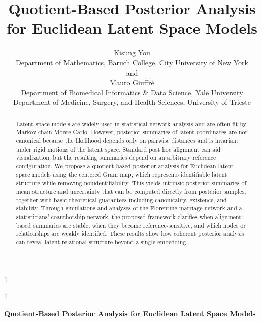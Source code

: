 \documentclass[12pt]{article}
\newcommand{\blind}{1}
\begin{document}
%

\def\spacingset#1{\renewcommand{\baselinestretch}%
{#1}\small\normalsize} \spacingset{1}



\blind
{
  \title{\bf Quotient-Based Posterior Analysis for Euclidean Latent Space Models}
  \author{Kisung You\\
    Department of Mathematics, Baruch College, City University of New York\\
    and \\
    Mauro Giuffr\`{e}\\
    Department of Biomedical Informatics \& Data Science, Yale University\\
    Department of Medicine, Surgery, and Health Sciences, University of Trieste\\
    }
  \maketitle
} \fi


\blind
{
  \bigskip
  \bigskip
  \bigskip
  \begin{center}
    {\LARGE\bf Quotient-Based Posterior Analysis for Euclidean Latent Space Models}
\end{center}
  \medskip
} \fi

\bigskip
\begin{abstract}
Latent space models are widely used in statistical network analysis and are often fit by Markov
chain Monte Carlo. However, posterior summaries of latent coordinates are not canonical because the
likelihood depends only on pairwise distances and is invariant under rigid motions of the latent
space. Standard post hoc alignment can aid visualization, but the resulting summaries depend on an
arbitrary reference configuration.  We propose a quotient-based posterior analysis for Euclidean latent space models using the centered
Gram map, which represents identifiable latent structure while removing nonidentifiability. This
yields intrinsic posterior summaries of mean structure and uncertainty that can be computed directly
from posterior samples, together with basic theoretical guarantees including canonicality, existence,
and stability.  Through simulations and analyses of the Florentine marriage network and a statisticians'
coauthorship network, the proposed framework clarifies when alignment-based summaries are stable,
when they become reference-sensitive, and which nodes or relationships are weakly identified. These
results show how coherent posterior analysis can reveal latent relational structure beyond a single
embedding.
\end{abstract}
\end{document}
